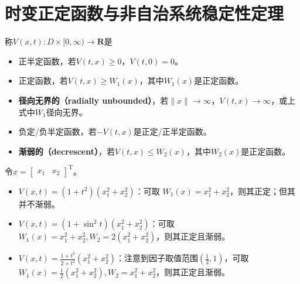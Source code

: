 \section{时变正定函数与非自治系统稳定性定理}\label{3Cref}
\begin{definition}
称$V(x,t): D \times [0, \infty) \rightarrow \mathbf{R}$是
    \begin{itemize}[leftmargin=1em]
      \item 正半定函数，若$V(t,x)\ge 0$，$V(t,0)=0$。
      \item 正定函数，若$V(t,x)\ge W_1(x)$，其中$W_1(x)$是正定函数。
      \item {\bf 径向无界的（radially unbounded）}，若$\|x\|\to\infty$，$V(t,x)\to \infty$，或上式中$W_1$径向无界。
      \item 负定/负半定函数，若$-V(t,x)$是正定/正半定函数。
      \item {\bf 渐弱的（decrescent）}，若$V(t,x)\le W_2(x)$，其中$W_2(x)$是正定函数。
    \end{itemize}
\end{definition}
\newpage
\begin{example}[正定与渐弱]
    令$x = [\begin{array}{cc}
    x_1& x_2
  \end{array}]^\mathrm{T}$。
  \begin{itemize}[leftmargin=1em]
    \item $V (x, t) = (1 + t^2) (x^2_1 + x_2^2)$：可取 $W_1 (x) = x^2_1 +
    x^2_2$，则其正定；但其并不渐弱。
    
    \item $V (x, t) = (1 + \sin^2 t) (x^2_1 + x_2^2)$：可取$W_1 (x) = x^2_1 +
    x^2_2, W_2 = 2 (x^2_1 + x^2_2)$，则其正定且渐弱。
    
    \item $V (x, t) = \frac{1 + t^2}{2 + t^2} (x^2_1 + x_2^2)$：注意到因子取值范围$(\frac12,1)$，可取 $W_1 (x)
    = \frac{1}{2} (x^2_1 + x^2_2), W_2 = x^2_1 + x^2_2$，则其正定且渐弱。
  \end{itemize}
\end{example}


